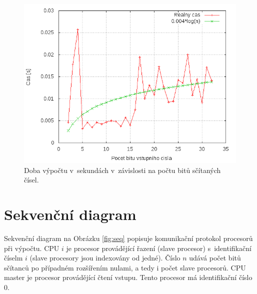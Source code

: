 \documentclass[a4paper, 12pt]{article}
\begin{document}
\begin{figure}[bt]
\begin{center}
    \includegraphics[scale=0.6]{perf.png}
    \caption{Doba výpočtu v~sekundách v~závislosti na počtu bitů sčítaných čísel.}
    \label{fig:res}
\end{center}
\end{figure}

\section{Sekvenční diagram}
\label{sec:seq}
Sekvenční diagram na Obrázku \ref{fig:seq} popisuje komunikační protokol procesorů
při výpočtu.
CPU $i$ je procesor provádějící řazení (slave procesor) s~identifikační
číselm $i$ (slave procesory jsou indexovány od jedné).
Číslo $n$ udává počet bitů sčítanců po případném rozšířením nulami, a tedy
i počet slave procesorů.
CPU master je procesor provádějící čtení vstupu.
Tento procesor má identifikační číslo $0$.
\end{document}
